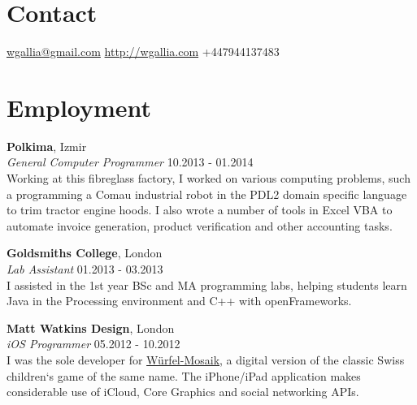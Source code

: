 \documentclass[margin,line,a4paper]{resume}
\begin{document}

\begin{resume}

\section{\mysidestyle Contact}

\hypersetup{urlcolor=Fuchsia}
\href{mailto:wgallia@gmail.com}{wgallia@gmail.com} \hfill
\hypersetup{urlcolor=RoyalBlue}
\href{http://wgallia.com}{http://wgallia.com} \hfill
+447944137483 \\


\section{\mysidestyle Employment}


\textbf{Polkima}, Izmir \vspace{1mm}\\
\textsl{General Computer Programmer} \hfill 10.2013 - 01.2014 \vspace{2mm} \\
Working at this fibreglass factory, I worked on various computing
problems, such a programming a Comau industrial robot in the PDL2
domain specific language to trim tractor engine hoods. I also wrote a
number of tools in Excel VBA to automate invoice generation, product
verification and other accounting tasks.

\textbf{Goldsmiths College}, London \vspace{1mm}\\
\textsl{Lab Assistant} \hfill 01.2013 - 03.2013 \vspace{2mm} \\
I assisted in the 1st year BSc and MA programming labs, helping
students learn Java in the Processing environment and C++ with
openFrameworks.

\textbf{Matt Watkins Design}, London \vspace{1mm}\\
\textsl{iOS Programmer} \hfill 05.2012 - 10.2012 \vspace{2mm} \\
I was the sole developer for
\href{http://wurfelmosaik.com/}{W\"{u}rfel-Mosaik}, a digital version
of the classic Swiss children`s game of the same name. The iPhone/iPad
application makes considerable use of iCloud, Core Graphics and social
networking APIs.


\end{resume}
\end{document}
